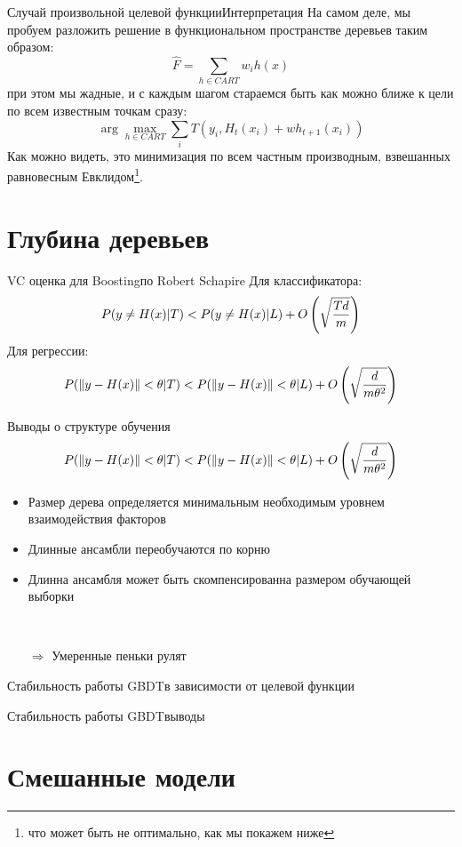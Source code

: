 \documentclass[14pt, fleqn, xcolor={dvipsnames, table}]{beamer}
\begin{document}
\begin{frame}{Случай произвольной целевой функции}{Интерпретация}
На самом деле, мы пробуем разложить решение в функциональном пространстве деревьев таким образом:
$$
\hat{F} = \sum_{h \in CART} w_i h(x) 
$$
при этом мы жадные, и с каждым шагом стараемся быть как можно ближе к цели по всем известным точкам сразу:
$$
\arg \max_{h \in CART} \sum_i T(y_i, H_t(x_i) + w h_{t+1}(x_i))
$$
Как можно видеть, это минимизация по всем частным производным, взвешанных равновесным Евклидом\footnote{что может быть не оптимально, как мы покажем ниже}.
\end{frame}

\section{Глубина деревьев}
\begin{frame}{VC оценка для Boosting}{по Robert Schapire}
Для классификатора:
$$
P(y \ne H(x) | T) < P(y \ne H(x) | L) + O\left(\sqrt{T d \over m}\right)
$$
Для регрессии:
$$
P(\|y - H(x)\| < \theta | T) < P(\|y - H(x)\| < \theta | L) + O\left(\sqrt{d \over m \theta^2}\right)
$$
\end{frame}

\begin{frame}{Выводы о структуре обучения}
$$
P(\|y - H(x)\| < \theta | T) < P(\|y - H(x)\| < \theta | L) + O\left(\sqrt{d \over m \theta^2}\right)
$$
\begin{itemize}
  \item Размер дерева определяется минимальным необходимым уровнем взаимодействия факторов
  \item Длинные ансамбли переобучаются по корню
  \item Длинна ансамбля может быть скомпенсированна размером обучающей выборки
  \item[~]
  \item[\color{blue}$\Rightarrow$] Умеренные пеньки рулят
\end{itemize}
\end{frame}

\begin{frame}{Стабильность работы GBDT}{в зависимости от целевой функции}
\end{frame}

\begin{frame}{Стабильность работы GBDT}{выводы}

\end{frame}

\section{Смешанные модели}
\end{document}
